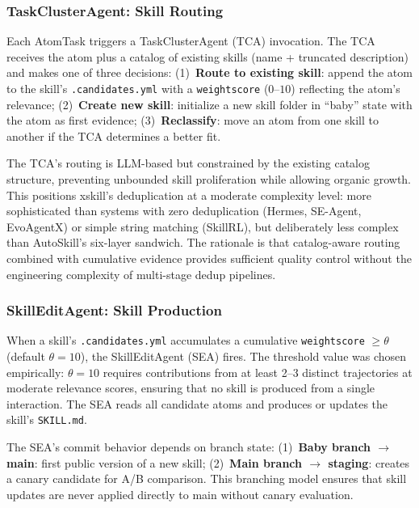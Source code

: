 \documentclass[11pt]{article}
\begin{document}
\subsubsection{TaskClusterAgent: Skill Routing}

Each AtomTask triggers a TaskClusterAgent (TCA) invocation. The TCA receives the atom plus a catalog of existing skills (name + truncated description) and makes one of three decisions: (1)~\textbf{Route to existing skill}: append the atom to the skill's \texttt{.candidates.yml} with a \texttt{weightscore} ($0$--$10$) reflecting the atom's relevance; (2)~\textbf{Create new skill}: initialize a new skill folder in ``baby'' state with the atom as first evidence; (3)~\textbf{Reclassify}: move an atom from one skill to another if the TCA determines a better fit.

The TCA's routing is LLM-based but constrained by the existing catalog structure, preventing unbounded skill proliferation while allowing organic growth. This positions xskill's deduplication at a moderate complexity level: more sophisticated than systems with zero deduplication (Hermes, SE-Agent, EvoAgentX) or simple string matching (SkillRL), but deliberately less complex than AutoSkill's six-layer sandwich. The rationale is that catalog-aware routing combined with cumulative evidence provides sufficient quality control without the engineering complexity of multi-stage dedup pipelines.

\subsubsection{SkillEditAgent: Skill Production}

When a skill's \texttt{.candidates.yml} accumulates a cumulative \texttt{weightscore} $\geq \theta$ (default $\theta = 10$), the SkillEditAgent (SEA) fires. The threshold value was chosen empirically: $\theta = 10$ requires contributions from at least 2--3 distinct trajectories at moderate relevance scores, ensuring that no skill is produced from a single interaction. The SEA reads all candidate atoms and produces or updates the skill's \texttt{SKILL.md}.

The SEA's commit behavior depends on branch state: (1)~\textbf{Baby branch $\to$ main}: first public version of a new skill; (2)~\textbf{Main branch $\to$ staging}: creates a canary candidate for A/B comparison. This branching model ensures that skill updates are never applied directly to main without canary evaluation.
\end{document}
